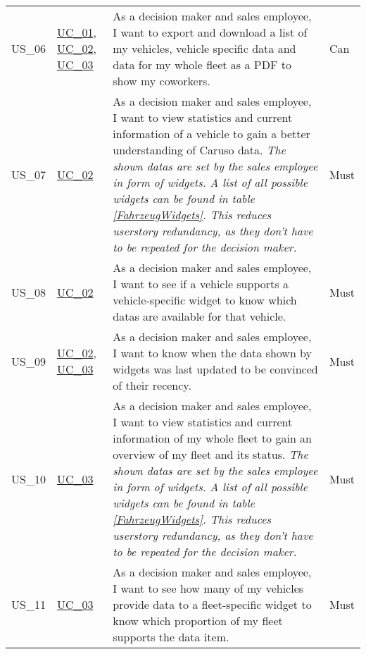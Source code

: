 \begin{footnotesize}
\begin{longtable}[L L L L]{ p{} p{} p{} p{}}
      \rowcolor{Gray}
      \hypertarget{Ref:US6}{US\_06} & \hyperlink{Ref:UC1}{UC\_01}, \newline \hyperlink{Ref:UC2}{UC\_02}, \newline \hyperlink{Ref:UC3}{UC\_03} & As a decision maker and sales employee, I want to export and download a list of my vehicles, vehicle specific data and data for my whole fleet as a PDF to show my coworkers. & Can \\

      \hypertarget{Ref:US7}{US\_07} & \hyperlink{Ref:UC2}{UC\_02} & As a decision maker and sales employee, I want to view statistics and current information of a vehicle to gain a better understanding of Caruso data. 
      \newline
      \emph{The shown \glspl{data} are set by the sales employee in form of \glspl{widget}. A list of all possible \glspl{widget} can be found in table \ref{FahrzeugWidgets}. This reduces \gls{userstory} redundancy, as they don't have to be repeated for the decision maker.} & Must \\

      \rowcolor{Gray}
      \hypertarget{Ref:US8}{US\_08} & \hyperlink{Ref:UC2}{UC\_02} & As a decision maker and sales employee, I want to see if a vehicle supports a vehicle-specific \gls{widget} to know which \glspl{data} are available for that vehicle. & Must
      \\

      \hypertarget{Ref:US9}{US\_09} & \hyperlink{Ref:UC2}{UC\_02}, \newline \hyperlink{Ref:UC3}{UC\_03} & As a decision maker and sales employee, I want to know when the data shown by \glspl{widget} was last updated to be convinced of their recency. & Must
      \\

      \rowcolor{Gray}
      \hypertarget{Ref:US10}{US\_10} & \hyperlink{Ref:UC3}{UC\_03} & As a decision maker and sales employee, I want to view statistics and current information of my whole fleet to gain an overview of my fleet and its status.
      \newline
      \emph{The shown \glspl{data} are set by the sales employee in form of \glspl{widget}. A list of all possible \glspl{widget} can be found in table \ref{FahrzeugWidgets}. This reduces \gls{userstory} redundancy, as they don't have to be repeated for the decision maker.} & Must \\

      \hypertarget{Ref:US11}{US\_11} & \hyperlink{Ref:UC3}{UC\_03} & As a decision maker and sales employee, I want to see how many of my vehicles provide data to a fleet-specific \gls{widget} to know which proportion of my fleet supports the data item. & Must \\


\end{longtable}
\end{footnotesize}
